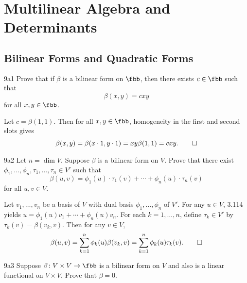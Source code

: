 \section{Multilinear Algebra and Determinants}

\subsection{Bilinear Forms and Quadratic Forms}

\begin{exercise}{9a1}
    Prove that if $\beta$ is a bilinear form on $\fbb$, then there exists $c \in \fbb$ such that
    \[
        \beta(x, y) = cxy
    \]
    for all $x, y \in \fbb$.
\end{exercise}

\begin{sol}
    Let $c = \beta(1, 1)$.
    Then for all $x, y \in \fbb$, homogeneity in the first and second slots gives
    \[
        \beta(x, y) = \beta(x \cdot 1, y \cdot 1) = xy \beta(1, 1) = cxy. \qedhere
    \]
\end{sol}

\begin{exercise}{9a2}
    Let $n = \dim V$.
    Suppose $\beta$ is a bilinear form on $V$.
    Prove that there exist $\phi_1, \ldots, \phi_n, \tau_1, \ldots, \tau_n \in V'$ such that
    \[
        \beta(u, v) = \phi_1(u) \cdot \tau_1(v) + \cdots + \phi_n(u) \cdot \tau_n(v)
    \]
    for all $u, v \in V$.

\end{exercise}

\begin{sol}
    Let $v_1, \ldots, v_n$ be a basis of $V$ with dual basis $\phi_1, \ldots, \phi_n$ of $V'$.
    For any $u \in V$, 3.114 yields $u = \phi_1(u)v_1 + \cdots + \phi_n(u)v_n$.
    For each $k = 1, \ldots, n$, define $\tau_k \in V'$ by $\tau_k(v) = \beta(v_k, v)$.
    Then for any $v \in V$,
    \[
        \beta(u, v) = \sum_{k=1}^n \phi_k(u) \beta(v_k, v) = \sum_{k=1}^n \phi_k(u) \tau_k(v). \qedhere
    \]
\end{sol}

\begin{exercise}{9a3}
    Suppose $\beta \colon V \times V \to \fbb$ is a bilinear form on $V$ and also is a linear functional on $V \times V$.
    Prove that $\beta = 0$.
\end{exercise}


